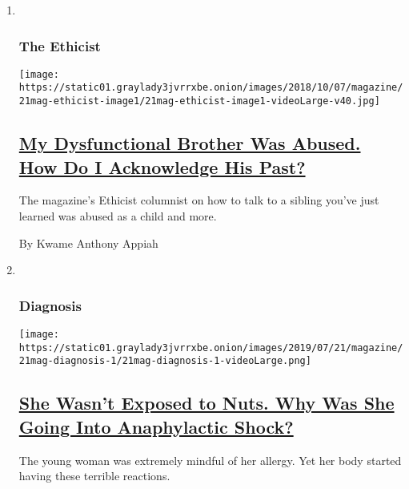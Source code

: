 \begin{enumerate}
\def\labelenumi{\arabic{enumi}.}
\item ~
  \hypertarget{the-ethicist}{%
  \subsubsection{The Ethicist}\label{the-ethicist}}

  \texttt{[image: https://static01.graylady3jvrrxbe.onion/images/2018/10/07/magazine/21mag-ethicist-image1/21mag-ethicist-image1-videoLarge-v40.jpg]}

  \hypertarget{my-dysfunctional-brother-was-abused-how-do-i-acknowledge-his-past}{%
  \subsection{\texorpdfstring{\href{/2019/07/16/magazine/my-dysfunctional-brother-was-an-abuse-victim-how-do-i-acknowledge-his-past.html}{My
  Dysfunctional Brother Was Abused. How Do I Acknowledge His
  Past?}}{My Dysfunctional Brother Was Abused. How Do I Acknowledge His Past?}}\label{my-dysfunctional-brother-was-abused-how-do-i-acknowledge-his-past}}

  The magazine's Ethicist columnist on how to talk to a sibling you've
  just learned was abused as a child and more.

  By Kwame Anthony Appiah
\item ~
  \hypertarget{diagnosis}{%
  \subsubsection{Diagnosis}\label{diagnosis}}

  \texttt{[image: https://static01.graylady3jvrrxbe.onion/images/2019/07/21/magazine/21mag-diagnosis-1/21mag-diagnosis-1-videoLarge.png]}

  \hypertarget{she-wasnt-exposed-to-nuts-why-was-she-going-into-anaphylactic-shock}{%
  \subsection{\texorpdfstring{\href{/2019/07/17/magazine/she-wasnt-exposed-to-nuts-why-was-she-going-into-anaphylactic-shock.html}{She
  Wasn't Exposed to Nuts. Why Was She Going Into Anaphylactic
  Shock?}}{She Wasn't Exposed to Nuts. Why Was She Going Into Anaphylactic Shock?}}\label{she-wasnt-exposed-to-nuts-why-was-she-going-into-anaphylactic-shock}}

  The young woman was extremely mindful of her allergy. Yet her body
  started having these terrible reactions.


\end{enumerate}
